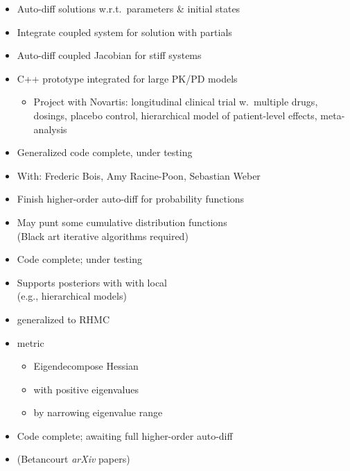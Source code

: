 \documentclass[10pt]{report}
\newcommand{\sld}[1]{\newpage{\noindent\LARGE \ \ \
    \textcolor{MidnightBlue}{\bfseries #1}}\vspace*{4pt}}
\newcommand{\myemph}[1]{{\color{MidnightBlue}{\bfseries #1}}}
\begin{document}
\sld{Differential Equation Solver}
\begin{itemize}
\item Auto-diff solutions w.r.t.\ parameters \& initial states
\item Integrate coupled system for solution with partials
\item Auto-diff coupled Jacobian for stiff systems
\vfill
\item C++ prototype integrated for large PK/PD models
\vspace*{-4pt}
\begin{itemize}\footnotesize
\item 
Project with Novartis: 
  longitudinal clinical trial w.\ multiple drugs, dosings, placebo control,
  hierarchical model of patient-level effects, meta-analysis
\end{itemize}
\vfill
\item Generalized code complete, under testing
\item {\footnotesize With: Frederic Bois, Amy Racine-Poon, Sebastian Weber}
\end{itemize}

\sld{Higher-Order Auto-diff}
\begin{itemize}
\item Finish higher-order auto-diff for probability functions
\item May punt some cumulative distribution functions
\\
{\footnotesize (Black art iterative algorithms required)}
\vfill
\item Code complete; under testing
\end{itemize}


\sld{Riemannian Manifold HMC}
\begin{itemize}
\item Supports posteriors with \myemph{position-dependent
    curvature} with local \myemph{mass matrix estimation}
\\
  {\small (e.g., hierarchical models)}
\item \myemph{NUTS} generalized to RHMC
\item \myemph{SoftAbs} metric
\vspace*{-4pt}
\begin{itemize}\footnotesize
\item Eigendecompose Hessian
\item \myemph{positive definite} with positive eigenvalues
\item \myemph{condition} by narrowing eigenvalue range
\end{itemize}
\vfill
\item Code complete; awaiting full higher-order auto-diff
\item {\small (Betancourt {\slshape arXiv} papers)}
\end{itemize}
\end{document}
